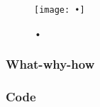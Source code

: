 \documentclass[Report.tex]{subfiles}
\begin{document}
\begin{figure}
\center
\texttt{[image: •]}
\caption{•}
\label{Fig:}
\end{figure}


\subsubsection{What-why-how}

\subsubsection{Code}
\end{document}

